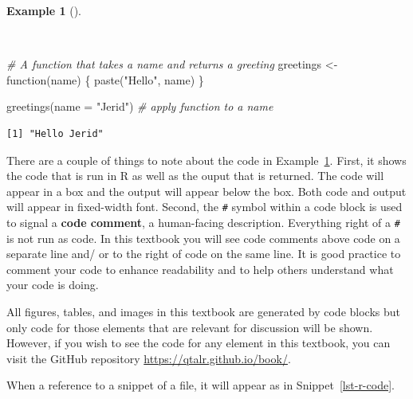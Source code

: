 \documentclass[
  letterpaper,
]{book}
\newenvironment{Shaded}{\begin{snugshade}}{\end{snugshade}}
\newcommand{\AttributeTok}[1]{\textcolor[rgb]{0.00,0.00,0.00}{#1}}
\newcommand{\CommentTok}[1]{\textcolor[rgb]{0.00,0.00,0.00}{\textit{#1}}}
\newcommand{\ControlFlowTok}[1]{\textcolor[rgb]{0.00,0.00,0.00}{#1}}
\newcommand{\DecValTok}[1]{\textcolor[rgb]{0.00,0.00,0.00}{#1}}
\newcommand{\FunctionTok}[1]{\textcolor[rgb]{0.00,0.00,0.00}{#1}}
\newcommand{\NormalTok}[1]{\textcolor[rgb]{0.00,0.00,0.00}{#1}}
\newcommand{\OtherTok}[1]{\textcolor[rgb]{0.00,0.00,0.00}{#1}}
\newcommand{\SpecialCharTok}[1]{\textcolor[rgb]{0.00,0.00,0.00}{#1}}
\newcommand{\StringTok}[1]{\textcolor[rgb]{0.00,0.00,0.00}{#1}}
\theoremstyle{definition}
\newtheorem{example}{Example}[chapter]
\theoremstyle{remark}
\begin{document}
\begin{example}[]\protect\hypertarget{exm-code-block}{}\label{exm-code-block}

~

\begin{Shaded}
\begin{Highlighting}[]
\CommentTok{\# A function that takes a name and returns a greeting}
\NormalTok{greetings }\OtherTok{\textless{}{-}} \ControlFlowTok{function}\NormalTok{(name) \{}
  \FunctionTok{paste}\NormalTok{(}\StringTok{"Hello"}\NormalTok{, name)}
\NormalTok{\}}

\FunctionTok{greetings}\NormalTok{(}\AttributeTok{name =} \StringTok{"Jerid"}\NormalTok{) }\CommentTok{\# apply function to a name}
\end{Highlighting}
\end{Shaded}

\begin{verbatim}
[1] "Hello Jerid"
\end{verbatim}

\end{example}

There are a couple of things to note about the code in
Example~\ref{exm-code-block}. First, it shows the code that is run in R
as well as the ouput that is returned. The code will appear in a box and
the output will appear below the box. Both code and output will appear
in fixed-width font. Second, the \texttt{\#} symbol within a code block
is used to signal a \textbf{code comment}, a human-facing description.
Everything right of a \texttt{\#} is not run as code. In this textbook
you will see code comments above code on a separate line and/ or to the
right of code on the same line. It is good practice to comment your code
to enhance readability and to help others understand what your code is
doing.

All figures, tables, and images in this textbook are generated by code
blocks but only code for those elements that are relevant for discussion
will be shown. However, if you wish to see the code for any element in
this textbook, you can visit the GitHub repository
\url{https://qtalr.github.io/book/}.

When a reference to a snippet of a file, it will appear as in
Snippet~\ref{lst-r-code}.

\begin{codelisting}

\caption{\label{lst-r-code}\emph{example.R} file}

\centering{

\begin{Shaded}
\begin{Highlighting}[]
\CommentTok{\# Load package}
\FunctionTok{library}\NormalTok{(tidyverse)}

\CommentTok{\# Add 1 and 1}
\DecValTok{1} \SpecialCharTok{+} \DecValTok{1}
\end{Highlighting}
\end{Shaded}

}

\end{codelisting}%
\end{document}
